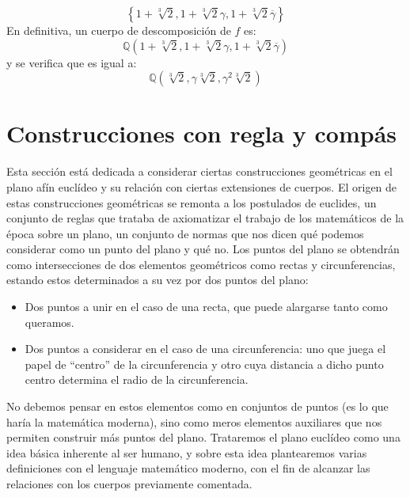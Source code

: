 \begin{ejercicio}
    \begin{equation*}
        \left\{1+\sqrt[3]{2}, 1+\sqrt[3]{2}\gamma, 1+\sqrt[3]{2}\overline{\gamma} \right\}
    \end{equation*}
    En definitiva, un cuerpo de descomposición de $f$ es:
    \begin{equation*}
        \mathbb{Q}\left(1+\sqrt[3]{2}, 1+\sqrt[3]{2}\gamma, 1+\sqrt[3]{2}\overline{\gamma}\right)
    \end{equation*}
    y se verifica que es igual a:
    \begin{equation*}
        \mathbb{Q}\left(\sqrt[3]{2}, \gamma\sqrt[3]{2}, \gamma^2\sqrt[3]{2}\right)
    \end{equation*}
\end{ejercicio}

\section{Construcciones con regla y compás} %
Esta sección está dedicada a considerar ciertas construcciones geométricas en el plano afín euclídeo y su relación con ciertas extensiones de cuerpos. El origen de estas construcciones geométricas se remonta a los postulados de euclides, un conjunto de reglas que trataba de axiomatizar el trabajo de los matemáticos de la época sobre un plano, un conjunto de normas que nos dicen qué podemos considerar como un punto del plano y qué no. Los puntos del plano se obtendrán como intersecciones de dos elementos geométricos como rectas y circunferencias, estando estos determinados a su vez por dos puntos del plano:
\begin{itemize}
    \item Dos puntos a unir en el caso de una recta, que puede alargarse tanto como queramos.
    \item Dos puntos a considerar en el caso de una circunferencia: uno que juega el papel de ``centro'' de la circunferencia y otro cuya distancia a dicho punto centro determina el radio de la circunferencia.
\end{itemize}
No debemos pensar en estos elementos como en conjuntos de puntos (es lo que haría la matemática moderna), sino como meros elementos auxiliares que nos permiten construir más puntos del plano. Trataremos el plano euclídeo como una idea básica inherente al ser humano, y sobre esta idea plantearemos varias definiciones con el lenguaje matemático moderno, con el fin de alcanzar las relaciones con los cuerpos previamente comentada.\\

